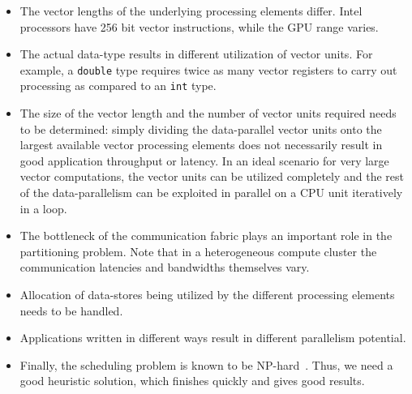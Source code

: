 \begin{itemize}

\item The vector lengths of the underlying processing elements
  differ. Intel processors have 256 bit vector instructions, while the
  GPU range varies.


\item The actual data-type results in different utilization of vector
  units. For example, a \texttt{double} type requires twice as many
  vector registers to carry out processing as compared to an
  \texttt{int} type.

\item The size of the vector length and the number of vector units
  required needs to be determined: simply dividing the data-parallel
  vector units onto the largest available vector processing elements
  does not necessarily result in good application throughput or
  latency. In an ideal scenario for very large vector computations, the
  vector units can be utilized completely and the rest of the
  data-parallelism can be exploited in parallel on a CPU unit
  iteratively in a loop.

\item The bottleneck of the communication fabric plays an important role
  in the partitioning problem. Note that in a heterogeneous compute
  cluster the communication latencies and bandwidths themselves vary.

\item Allocation of data-stores being utilized by the different
  processing elements needs to be handled.

\item Applications written in different ways result in different
  parallelism potential.

\item Finally, the scheduling problem is known to be
  NP-hard~\cite{vsar89}. Thus, we need a good heuristic solution, which
  finishes quickly and gives good results.

\end{itemize}

